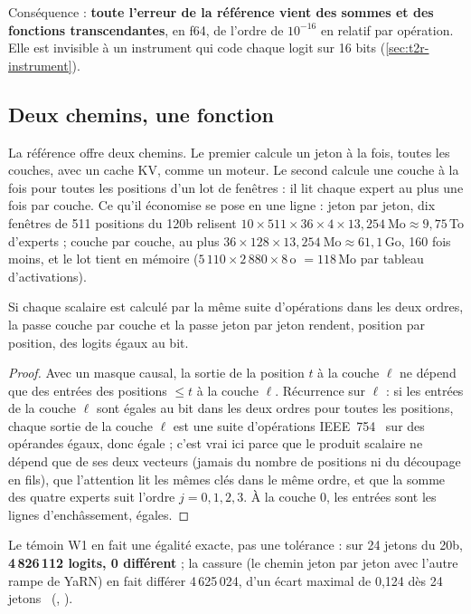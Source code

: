 Conséquence : \textbf{toute l'erreur de la référence vient des sommes et des fonctions transcendantes}, en f64, de l'ordre de $10^{-16}$ en relatif par opération. Elle est invisible à un instrument qui code chaque logit sur 16 bits (\cref{sec:t2r-instrument}).

\subsection{Deux chemins, une fonction}\label{sec:t2r-chemins}

La référence offre deux chemins. Le premier calcule un jeton à la fois, toutes les couches, avec un cache KV, comme un moteur. Le second calcule une couche à la fois pour toutes les positions d'un lot de fenêtres : il lit chaque expert au plus une fois par couche. Ce qu'il économise se pose en une ligne \calc : jeton par jeton, dix fenêtres de 511 positions du 120b relisent $10 \times 511 \times 36 \times 4 \times 13{,}254~\text{Mo} \approx 9{,}75$\,To d'experts ; couche par couche, au plus $36 \times 128 \times 13{,}254~\text{Mo} \approx 61{,}1$\,Go, 160 fois moins, et le lot tient en mémoire ($5\,110 \times 2\,880 \times 8$\,o $= 118$\,Mo par tableau d'activations).

\begin{proposition}\label{prop:t2r-chemins}
Si chaque scalaire est calculé par la même suite d'opérations dans les deux ordres, la passe couche par couche et la passe jeton par jeton rendent, position par position, des logits égaux au bit.
\end{proposition}

\begin{proof}
Avec un masque causal, la sortie de la position $t$ à la couche $\ell$ ne dépend que des entrées des positions $\le t$ à la couche $\ell$. Récurrence sur $\ell$ : si les entrées de la couche $\ell$ sont égales au bit dans les deux ordres pour toutes les positions, chaque sortie de la couche $\ell$ est une suite d'opérations IEEE~754~\cite{higham2002} sur des opérandes égaux, donc égale ; c'est vrai ici parce que le produit scalaire ne dépend que de ses deux vecteurs (jamais du nombre de positions ni du découpage en fils), que l'attention lit les mêmes clés dans le même ordre, et que la somme des quatre experts suit l'ordre $j = 0, 1, 2, 3$. À la couche 0, les entrées sont les lignes d'enchâssement, égales.
\end{proof}

Le témoin W1 en fait une égalité exacte, pas une tolérance : sur 24 jetons du 20b, \textbf{4\,826\,112 logits, 0 différent} ; la cassure (le chemin jeton par jeton avec l'autre rampe de YaRN) en fait différer 4\,625\,024, d'un écart maximal de 0,124 dès 24 jetons \mes~(, ).

